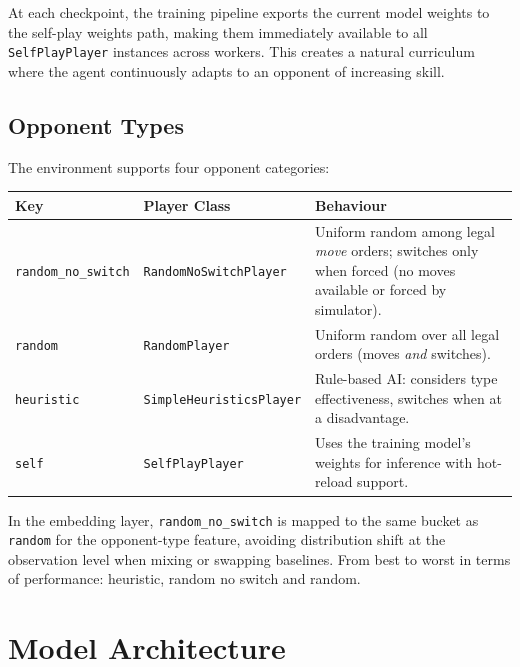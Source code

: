 At each checkpoint, the training pipeline exports the current model weights to
the self-play weights path, making them immediately available to all
\texttt{SelfPlayPlayer} instances across workers.  This creates a natural
curriculum where the agent continuously adapts to an opponent of increasing
skill.


\subsection{Opponent Types}

The environment supports four opponent categories:

\begin{center}
\small
\begin{tabularx}{\textwidth}{l l X}
  \toprule
  \textbf{Key} & \textbf{Player Class} & \textbf{Behaviour} \\
  \midrule
  \texttt{random\_no\_switch} & \texttt{RandomNoSwitchPlayer} &
    Uniform random among legal \emph{move} orders; switches only when forced
    (no moves available or forced by simulator). \\
  \texttt{random} & \texttt{RandomPlayer} &
    Uniform random over all legal orders (moves \emph{and} switches). \\
  \texttt{heuristic} & \texttt{SimpleHeuristicsPlayer} &
    Rule-based AI: considers type effectiveness, switches when at a
    disadvantage. \\
  \texttt{self} & \texttt{SelfPlayPlayer} &
    Uses the training model's weights for inference with hot-reload support. \\
  \bottomrule
\end{tabularx}
\end{center}

In the embedding layer, \texttt{random\_no\_switch} is mapped to the same
bucket as \texttt{random} for the opponent-type feature, avoiding distribution
shift at the observation level when mixing or swapping baselines. From best to worst in terms of performance: heuristic, random no switch and random.

\section{Model Architecture}
\label{sec:architecture}

